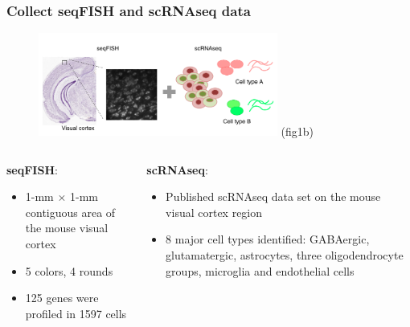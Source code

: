 \documentclass{beamer}
\begin{document}
  \begin{frame}
  \frametitle{Collect seqFISH and scRNAseq data}
  \begin{figure}
    \centering
    \includegraphics[width=0.7\textwidth]{data} (fig1b)
  \end{figure}
  \begin{columns}
  \begin{column}{0.4\textwidth}
    \textbf{seqFISH}:
    \begin{itemize}
      \item 1-mm $\times$ 1-mm contiguous area of the mouse visual cortex
      \item 5 colors, 4 rounds
      \item 125 genes were profiled in 1597 cells
    \end{itemize}
  \end{column}
  \begin{column}{0.6\textwidth}  %
    \textbf{scRNAseq}:
    \begin{itemize}
      \item Published scRNAseq data set on the mouse visual cortex region
      \item 8 major cell types identified: GABAergic, glutamatergic, astrocytes, three oligodendrocyte groups, microglia and endothelial cells
    \end{itemize}
  \end{column}
  \end{columns}
  \end{frame}
\end{document}
